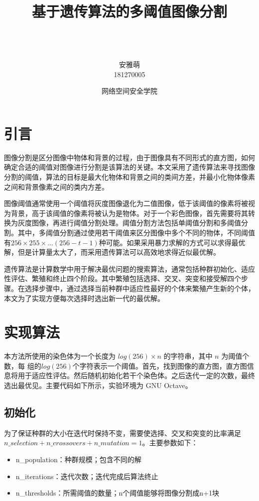 \documentclass[11pt,a4paper,titlepage]{article}
\title{ 
  \HRule{0.5pt} \\
  基于遗传算法的多阈值图像分割 \\
  \HRule{2pt} \\ [0.5cm]}
\author{\\[3cm]
  安雅萌\\[0.1cm]
  181270005\\[0.1cm]
  }
\date{网络空间安全学院}
\begin{document}
\maketitle
\setmainfont{Helvetica}
\setlength{\parindent}{2em}

\section{引言}

图像分割是区分图像中物体和背景的过程，由于图像具有不同形式的直方图，如何确定合适的阈值对图像进行分割是该算法的关键。本文采用了遗传算法来寻找图像分割的阈值，算法的目标是最大化物体和背景之间的类间方差，并最小化物体像素之间和背景像素之间的类内方差\cite{gonzalez2002digital}。

图像阈值通常使用一个阈值将灰度图像退化为二值图像，低于该阈值的像素将被视为背景，高于该阈值的像素将被认为是物体。对于一个彩色图像，首先需要将其转换为灰度图像，再进行阈值分割处理。阈值分割方法包括单阈值分割和多阈值分割。其中，多阈值分割通过使用若干阈值来区分图像中多个不同的物体\cite{banimelhem2011multi}，不同阈值有$256\times255\times...(256-t-1)$种可能。如果采用暴力求解的方式可以求得最优解，但是计算量太大了，而采用遗传算法可以高效地求得近似最优解。

遗传算法是计算数学中用于解决最优问题的搜索算法，通常包括种群初始化、适应性评估、繁殖和终止四个阶段\cite{mitchell1998introduction}。其中繁殖包括选择、交叉、突变和接受解四个步骤。在选择步骤中，通过选择当前种群中适应性最好的个体来繁殖产生新的个体，本文为了实现方便每次选择时选出新一代的最优解。

\section{实现算法}

本方法所使用的染色体为一个长度为 $log(256)\times n$ 的字符串，其中 $n$ 为阈值个数，每 组的$log(256)$个字符表示一个阈值。首先，找到图像的直方图，直方图信息将用于适应性评估。然后随机初始化若干个染色体。之后迭代一定的次数，最终选出最优见。主要代码如下所示，实验环境为 GNU Octave。

\subsection{初始化}
为了保证种群的大小在迭代时保持不变，需要使选择、交叉和突变的比率满足 $n\_selection + n\_crossovers + n\_mutation = 1$。主要参数如下：
\begin{itemize}
  \item n\_population：种群规模；包含不同的解
  \item n\_iterations：迭代次数；迭代完成后算法终止
  \item n\_thresholds：所需阈值的数量；n个阈值能够将图像分割成n+1块
\end{itemize}
\end{document}
